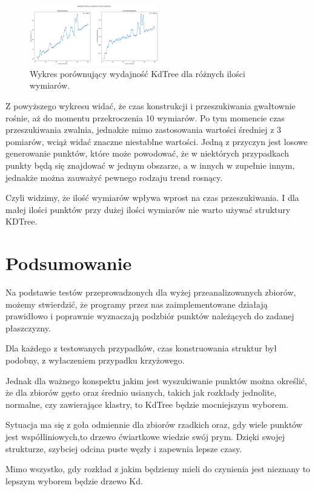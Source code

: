 \documentclass{lab}
\begin{document}
\begin{figure}[H]
  \centering
  \includegraphics[width=0.5\textwidth]{resources/dimensions_graph.png}
  \caption{Wykres porównujący wydajność KdTree dla różnych ilości wymiarów.}
  \label{fig:dimensions_graph}
\end{figure}

Z powyższego wykresu widać, że czas konstrukcji i przeszukiwania gwałtownie rośnie, aż do momentu przekroczenia 10 wymiarów.
Po tym momencie czas przeszukiwania zwalnia, jednakże mimo zastosowania wartości średniej z 3 pomiarów, wciąż widać znaczne niestablne wartości.
Jedną z przyczyn jest losowe generowanie punktów, które może powodować, że w niektórych przypadkach punkty będą się znajdować w jednym obszarze, a w innych w zupełnie innym, jednakże 
można zauważyć pewnego rodzaju trend rosnący. 

Czyli widzimy, że ilość wymiarów wpływa wprost na czas przeszukiwania. I dla małej ilości punktów przy
dużej ilości wymiarów nie warto używać struktury KDTree.

\section{Podsumowanie}
Na podstawie testów przeprowadzonych dla wyżej przeanalizowanych zbiorów, możemy
stwierdzić, że programy przez nas zaimplementowane działają prawidłowo i poprawnie wyznaczają podzbiór punktów należących do zadanej płaszczyzny. 

Dla każdego z testowanych przypadków, czas konstruowania struktur był podobny, z wyłaczeniem przypadku krzyżowego. 

Jednak dla ważnego konspektu jakim jest wyszukiwanie punktów można określić, że dla zbiorów gęsto oraz średnio usianych, takich jak rozkłady jednolite, normalne, czy zawierające klastry, to KdTree będzie mocniejszym wyborem. 

Sytuacja ma się z goła odmiennie dla zbiorów rzadkich oraz, gdy wiele punktów jest współliniowych,to drzewo ćwiartkowe wiedzie swój prym. Dzięki swojej strukturze, szybciej odcina puste węzły i zapewnia lepsze czasy.

Mimo wszystko, gdy rozkład z jakim będziemy mieli do czynienia jest nieznany to lepszym wyborem będzie drzewo Kd.
\end{document}
